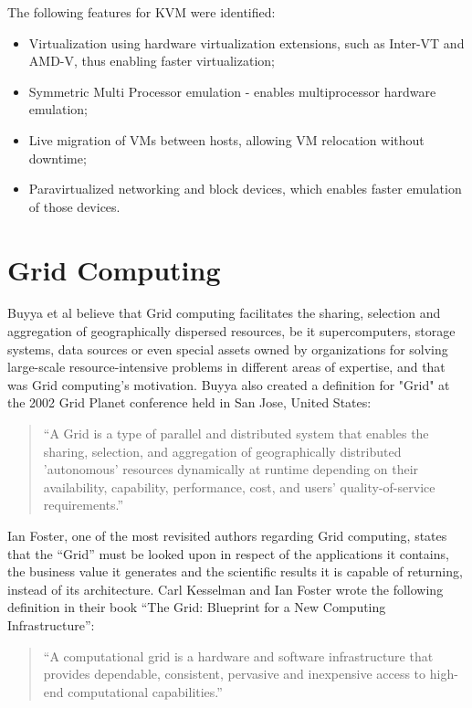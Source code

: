 The following features for KVM were identified:
\begin{itemize}
\item Virtualization using hardware virtualization extensions, such as Inter-VT and AMD-V, thus enabling faster virtualization;
\item Symmetric Multi Processor emulation - enables multiprocessor hardware emulation;
\item Live migration of VMs between hosts, allowing VM relocation without downtime;
\item Paravirtualized networking and block devices, which enables faster emulation of those devices. \cite{nuno-cardoso}
\end{itemize}

\section{Grid Computing} \label{sec:grid}

Buyya et al believe that Grid computing facilitates the sharing, selection and aggregation of geographically dispersed resources, be it supercomputers, storage systems, data sources or even special assets owned by organizations for solving large-scale resource-intensive problems in different areas of expertise, and that was Grid computing's motivation.
Buyya also created a definition for "Grid" at the 2002 Grid Planet conference held in San Jose, United States:

\begin{quote}
	``A Grid is a type of parallel and distributed system that enables the sharing, selection, and aggregation of geographically distributed 'autonomous'
 resources dynamically at runtime depending on their availability, capability, performance, cost, and users' quality-of-service requirements.''\cite{Buyya2009599}
 \end{quote} 

Ian Foster, one of the most revisited authors regarding Grid computing, states that the “Grid” must be looked upon in respect of the applications it contains, the business value it generates and the scientific results it is capable of returning, instead of its architecture.
Carl Kesselman and Ian Foster wrote the following definition in their book ``The Grid: Blueprint for a New Computing Infrastructure'':
\begin{quote}
``A computational grid is a hardware and software infrastructure that provides dependable, consistent, pervasive and inexpensive access to high-end computational capabilities.''\cite{gridbook}
\end{quote}

